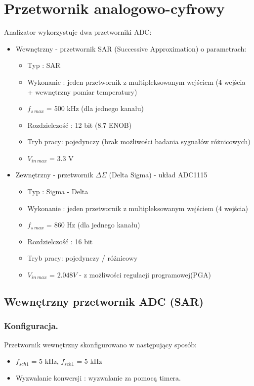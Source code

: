 \section{Przetwornik analogowo-cyfrowy}
Analizator wykorzystuje dwa przetworniki ADC:
\begin{itemize}
    \item Wewnętrzny - przetwornik SAR (Successive Approximation) o parametrach:
        \begin{itemize}
            \item Typ : SAR
            \item Wykonanie : jeden przetwornik z multipleksowanym wejściem (4 wejścia + wewnętrzny pomiar temperatury)
            \item $f_{s\ max}$ = 500 kHz (dla jednego kanału)
            \item Rozdzielczość : 12 bit (8.7 ENOB)
            \item Tryb pracy: pojedynczy (brak możliwości badania sygnałów różnicowych) 
            \item $V_{in\ max}$ = 3.3 V
        \end{itemize}
        
    \item Zewnętrzny - przetwornik $\Delta\Sigma$ (Delta Sigma) - układ ADC1115
        \begin{itemize}
            \item Typ : Sigma - Delta
            \item Wykonanie : jeden przetwornik z multipleksowanym wejściem (4 wejścia) 
            \item $f_{s\ max}$ = 860 Hz (dla jednego kanału)
            \item Rozdzielczość : 16 bit 
            \item Tryb pracy: pojedynczy / różnicowy
            \item $V_{in\ max}$ = $2.048V$ - z możliwości regulacji programowej(PGA)
        \end{itemize}
\end{itemize}

\subsection{Wewnętrzny przetwornik ADC (SAR)}
\subsubsection{Konfiguracja.}
Przetwornik wewnętrzny skonfigurowano w następujący sposób:
    \begin{itemize}
        \item $f_{sch1}$ = 5 kHz, $f_{sch1}$ = 5 kHz
        \item Wyzwalanie konwersji : wyzwalanie za pomocą timera. 
    \end{itemize}

